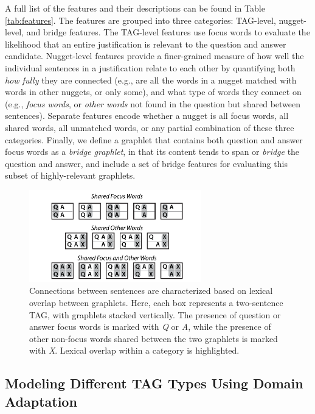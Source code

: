 A full list of the features and their descriptions can be found in Table \ref{tab:features}.
%
The features are grouped into three categories: TAG-level, nugget-level, and bridge features. 
The TAG-level features use focus words to evaluate the likelihood that an entire justification is relevant to the question and answer candidate. 
Nugget-level features provide a finer-grained measure of how well the individual sentences in a justification relate to each other by quantifying both \emph{how fully} they are connected (e.g., are all the words in a nugget matched with words in other nuggets, or only some), and what type of words they connect on (e.g., \emph{focus words}, or \emph{other words} not found in the question but shared between sentences).
Separate features encode whether a nugget is all focus words, all shared words, all unmatched words, or any partial combination of these three categories.
Finally, we define a graphlet that contains both question and answer focus words as a \emph{bridge graphlet}, in that its content tends to span or \emph{bridge} the question and answer, and include a set of bridge features for evaluating this subset of highly-relevant graphlets. 




\begin{figure}[t!]
\begin{center}
\includegraphics[width=75mm]{mainmatter/tacl2015-tig/connection_types.pdf}
\caption{{Connections between sentences are characterized based on lexical overlap between graphlets.
Here, each box represents a two-sentence TAG, with graphlets stacked vertically.  The presence of question or answer focus words is marked with \emph{Q} or \emph{A}, while the presence of other non-focus words shared between the two graphlets is marked with \emph{X}.  Lexical overlap within a category is highlighted.
}}
\label{fig:connectiontypes}
\end{center}
\end{figure}


\subsection {Modeling Different TAG Types Using Domain Adaptation} %
\label{sec-cl2017:characterizing}

